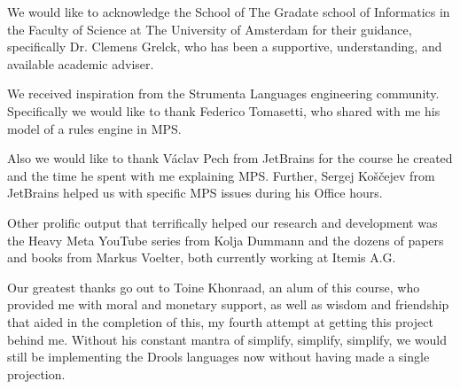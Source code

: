 \begin{acknowledgements}
\addchaptertocentry{\acknowledgementname}
We would like to acknowledge the School of The Gradate school of Informatics in the Faculty of Science at The University of Amsterdam for their guidance, specifically Dr. Clemens Grelck, who has been a supportive, understanding, and available academic adviser.


We received inspiration from the Strumenta Languages engineering community.
Specifically we would like to thank Federico Tomasetti, who shared with me his model of a rules engine in MPS.


Also we would like to thank Václav Pech from JetBrains for the course he created and the time he spent with me explaining MPS.
Further, Sergej Koščejev from JetBrains helped us with specific MPS issues during his Office hours.


Other prolific output that terrifically helped our research and development was the Heavy Meta YouTube series from Kolja Dummann and the dozens of papers and books from Markus Voelter, both currently working at Itemis A.G.


Our greatest thanks go out to Toine Khonraad, an alum of this course, who provided me with moral and monetary support, as well as wisdom and friendship that aided in the completion of this, my fourth attempt at getting this project behind me.
Without his constant mantra of simplify, simplify, simplify, we would still be implementing the Drools languages now without having made a single projection.
    
\end{acknowledgements}